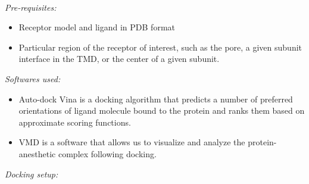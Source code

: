 \documentclass[12pt]{article}
\begin{document}
\hfill \break
\\
\textit{Pre-requisites:} 
\begin{itemize}
  \item Receptor model and ligand in PDB format
  \item Particular region of the receptor of interest, such as the pore, a given subunit interface in the TMD, or the center of a given subunit.  
\end{itemize}
\textit{Softwares used:} 
\begin{itemize}
  \item Auto-dock Vina \cite{Trott2010} is a docking algorithm that predicts a number of preferred orientations of ligand molecule bound to the protein and ranks them based on approximate scoring functions.
  \item VMD  \cite{Humphrey1996a} is a software that allows us to visualize  and analyze the protein-anesthetic complex following docking.
\end{itemize}
\textit{Docking setup:} 
\end{document}
